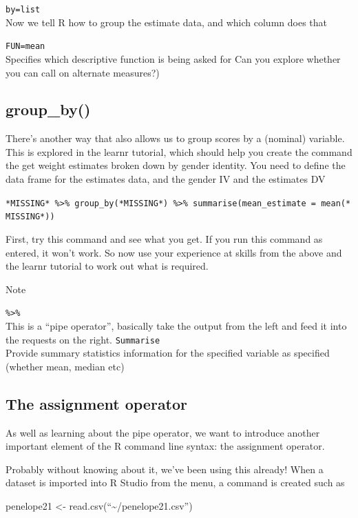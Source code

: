 \documentclass[
]{book}
\begin{document}
\texttt{by=list}~\\
Now we tell R how to group the estimate data, and which column does that

\texttt{FUN=mean}~\\
Specifies which descriptive function is being asked for
Can you explore whether you can call on alternate measures?)

\hypertarget{group_by}{%
\subsection{group\_by()}\label{group_by}}

There's another way that also allows us to group scores by a (nominal) variable. This is explored in the learnr tutorial, which should help you create the command the get weight estimates broken down by gender identity. You need to define the data frame for the estimates data, and the gender IV and the estimates DV

\texttt{*MISSING*\ \%\textgreater{}\%\ group\_by(*MISSING*)\ \%\textgreater{}\%\ summarise(mean\_estimate\ =\ mean(*MISSING*))}

First, try this command and see what you get. If you run this command as entered, it won't work. So now use your experience at skills from the above and the learnr tutorial to work out what is required.

Note

\texttt{\%\textgreater{}\%}~\\
This is a ``pipe operator'', basically take the output from the left and feed it into the requests on the right. \texttt{Summarise}\\
Provide summary statistics information for the specified variable as specified (whether mean, median etc)

\hypertarget{the-assignment-operator}{%
\subsection{The assignment operator}\label{the-assignment-operator}}

As well as learning about the pipe operator, we want to introduce another important element of the R command line syntax: the assignment operator.

Probably without knowing about it, we've been using this already! When a dataset is imported into R Studio from the menu, a command is created such as

penelope21 \textless- read.csv(``\textasciitilde/penelope21.csv'')
\end{document}
